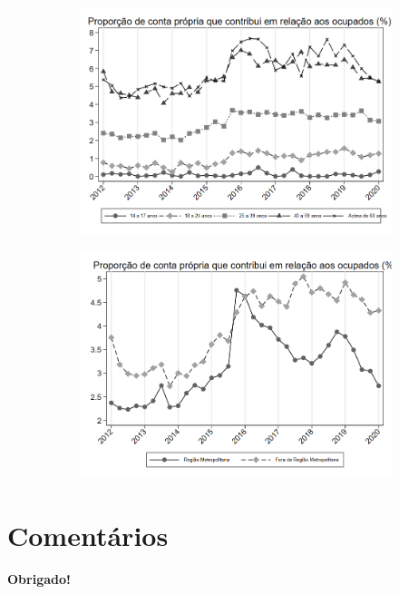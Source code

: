 \documentclass[11pt]{beamer}
\begin{document}
\begin{frame}
\begin{figure}[h!tpb]
\begin{subfigure}{.5\textwidth}
  \centering
  \includegraphics[width=.95\linewidth]{../../analysis/output/composicao_demografica/faixa_etaria/_composicao_demografica_faixa_etaria_prop_cpropriaC.png}
  \label{fig:_composicao_demografica_faixa_etaria_prop_cpropriaC}
\end{subfigure}%
\begin{subfigure}{.5\textwidth}
  \centering
  \includegraphics[width=.95\linewidth]{../../analysis/output/composicao_demografica/area_geografica/_composicao_demografica_regiao_metro_prop_cpropriaC.png}
  \label{fig:_composicao_demografica_regiao_metro_prop_cpropriaC}
\end{subfigure}

\label{fig:composicao_demografica}
\end{figure}
\end{frame}

%

\section{Comentários}


\frame
{
    \begin{center}
     \vfill
    \textbf{Obrigado!}
     \\

     \vfill
\end{center}
}
\end{document}
